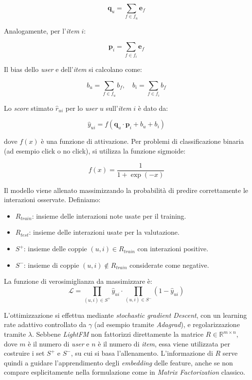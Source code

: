 \[
\mathbf{q}_u = \sum_{f \in f_u} \mathbf{e}_f
\]

Analogamente, per l'\textit{item} $i$:

\[
\mathbf{p}_i = \sum_{f \in f_i} \mathbf{e}_f
\]

Il bias dello \textit{user} e dell'\textit{item} si calcolano come:

\[
b_u = \sum_{f \in f_u} b_f, \quad b_i = \sum_{f \in f_i} b_f
\]

Lo \textit{score} stimato $\hat{r}_{ui}$ per lo \textit{user} $u$ sull'\textit{item} $i$ è dato da:

\[
\hat{y}_{ui} = f\left( \mathbf{q}_u \cdot \mathbf{p}_i + b_u + b_i \right)
\]

dove $f(x)$ è una funzione di attivazione. Per problemi di classificazione binaria (ad esempio click o no click), si utilizza la funzione sigmoide:

\[
f(x) = \frac{1}{1 + \exp(-x)}
\]

Il modello viene allenato massimizzando la probabilità di predire correttamente le interazioni osservate. Definiamo:

\begin{itemize}
    \item $R_{train}$: insieme delle interazioni note usate per il training.
    \item $R_{test}$: insieme delle interazioni usate per la valutazione.
    \item $S^+$: insieme delle coppie $(u, i) \in R_{train}$ con interazioni positive.
    \item $S^-$: insieme di coppie $(u, i) \notin R_{train}$ considerate come negative.
\end{itemize}

La funzione di verosimiglianza da massimizzare è:
\[
\mathcal{L} = \prod_{(u,i) \in S^+} \hat{y}_{ui} \cdot \prod_{(u,i) \in S^-} (1 - \hat{y}_{ui})
\]

L'ottimizzazione si effettua mediante \textit{stochastic gradient Descent}, con un learning rate adattivo controllato da $\gamma$ (ad esempio tramite \textit{Adagrad}), e regolarizzazione tramite $\lambda$. Sebbene \textit{LightFM} non fattorizzi direttamente la matrice $R \in \mathbb{R}^{m \times n}$, dove $m$ è il numero di \textit{user} e $n$ è il numero di \textit{item}, essa viene utilizzata per costruire i set $S^+$ e $S^-$, su cui si basa l'allenamento. L'informazione di $R$ serve quindi a guidare l'apprendimento degli \textit{embedding} delle feature, anche se non compare esplicitamente nella formulazione come in \textit{Matrix Factorization} classico.

